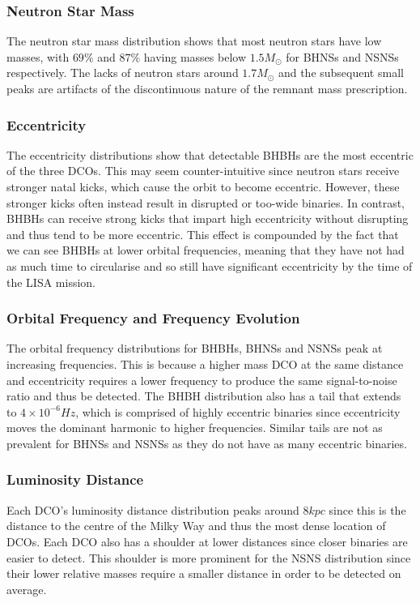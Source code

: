 \subsubsection{Neutron Star Mass}
The neutron star mass distribution shows that most neutron stars have low masses, with $69\%$ and $87\%$ having masses below $1.5 \unit{M_{\odot}}$ for BHNSs and NSNSs respectively. The lacks of neutron stars around $1.7 \unit{M_{\odot}}$ and the subsequent small peaks are artifacts of the discontinuous nature of the \citet{Fryer+2012} remnant mass prescription.

\subsubsection{Eccentricity}
The eccentricity distributions show that detectable BHBHs are the most eccentric of the three DCOs. This may seem counter-intuitive since neutron stars receive stronger natal kicks, which cause the orbit to become eccentric. However, these stronger kicks often instead result in disrupted or too-wide binaries. In contrast, BHBHs can receive strong kicks that impart high eccentricity without disrupting and thus tend to be more eccentric. This effect is compounded by the fact that we can see BHBHs at lower orbital frequencies, meaning that they have not had as much time to circularise and so still have significant eccentricity by the time of the LISA mission.

\subsubsection{Orbital Frequency and Frequency Evolution}
The orbital frequency distributions for BHBHs, BHNSs and NSNSs peak at increasing frequencies. This is because a higher mass DCO at the same distance and eccentricity requires a lower frequency to produce the same signal-to-noise ratio and thus be detected. The BHBH distribution also has a tail that extends to $4 \times 10^{-6} \unit{Hz}$, which is comprised of highly eccentric binaries since eccentricity moves the dominant harmonic to higher frequencies. Similar tails are not as prevalent for BHNSs and NSNSs as they do not have as many eccentric binaries.

\subsubsection{Luminosity Distance}
Each DCO's luminosity distance distribution peaks around $8 \unit{kpc}$ since this is the distance to the centre of the Milky Way and thus the most dense location of DCOs. Each DCO also has a shoulder at lower distances since closer binaries are easier to detect. This shoulder is more prominent for the NSNS distribution since their lower relative masses require a smaller distance in order to be detected on average.

